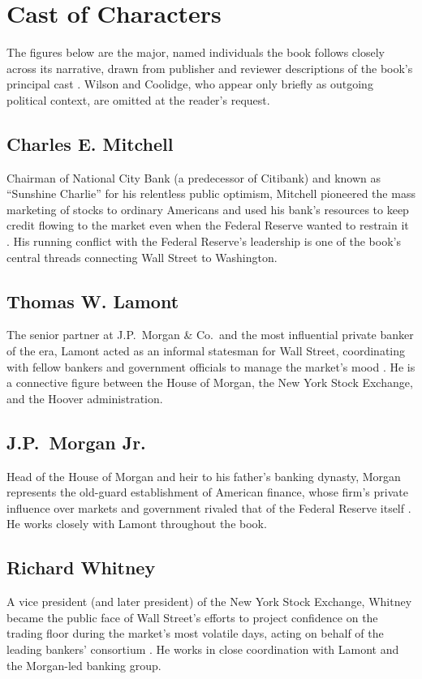 \documentclass[11pt]{article}
\begin{document}
\section{Cast of Characters}

The figures below are the major, named individuals the book follows closely across
its narrative, drawn from publisher and reviewer descriptions of the book's
principal cast \autocite{supersummary1929,booksthatslay1929,littlerbooks1929}. Wilson
and Coolidge, who appear only briefly as outgoing political context, are omitted at
the reader's request.

\subsection{Charles E. Mitchell}
Chairman of National City Bank (a predecessor of Citibank) and known as ``Sunshine
Charlie'' for his relentless public optimism, Mitchell pioneered the mass marketing
of stocks to ordinary Americans and used his bank's resources to keep credit flowing
to the market even when the Federal Reserve wanted to restrain it
\autocite{airmail1929,supersummary1929}. His running conflict with the Federal
Reserve's leadership is one of the book's central threads connecting Wall Street to
Washington.

\subsection{Thomas W. Lamont}
The senior partner at J.P.\ Morgan \& Co.\ and the most influential private banker of
the era, Lamont acted as an informal statesman for Wall Street, coordinating with
fellow bankers and government officials to manage the market's mood
\autocite{supersummary1929,dailyeconomy1929}. He is a connective figure between the
House of Morgan, the New York Stock Exchange, and the Hoover administration.

\subsection{J.P.\ Morgan Jr.}
Head of the House of Morgan and heir to his father's banking dynasty, Morgan
represents the old-guard establishment of American finance, whose firm's private
influence over markets and government rivaled that of the Federal Reserve itself
\autocite{supersummary1929}. He works closely with Lamont throughout the book.

\subsection{Richard Whitney}
A vice president (and later president) of the New York Stock Exchange, Whitney
became the public face of Wall Street's efforts to project confidence on the trading
floor during the market's most volatile days, acting on behalf of the leading
bankers' consortium \autocite{supersummary1929,csmonitor1929}. He works in close
coordination with Lamont and the Morgan-led banking group.
\end{document}
